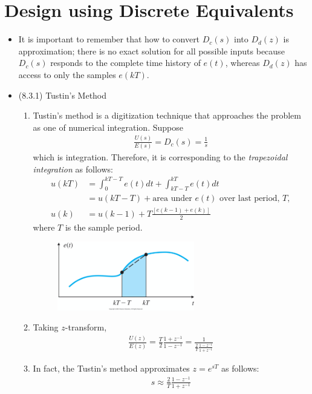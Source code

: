 \documentclass[landscape,14pt]{oblivoir}
\begin{document}
\section{Design using Discrete Equivalents}
\begin{itemize}
	\item It is important to remember that how to convert $D_c(s)$ into $D_d(z)$ is approximation; there is no exact solution for all possible inputs because $D_c(s)$ responds to the complete time history of $e(t)$, whereas $D_d(z)$ has access to only the samples $e(kT)$. 
	\item (8.3.1) Tustin's Method
	\begin{enumerate}
		\item Tustin's method is a digitization technique that approaches the problem as one of numerical integration. Suppose 
		\begin{align*}
			\frac{U(s)}{E(s)}  = D_c(s) = \frac{1}{s} 
		\end{align*}
		which is integration. Therefore, it is corresponding to the \emph{trapezoidal integration} as follows:
		\begin{align*}
			u(kT) &= \int_{0}^{kT-T} e(t) dt + \int_{kT -T}^{kT} e(t) dt \\
			&= u(kT-T) + \mbox{area under $e(t)$ over last period, $T$},  \\
			u(k) &= u(k-1) + T \frac{[e(k-1)+e(k)]}{2}
		\end{align*}
		where $T$ is the sample period. 
		\begin{figure}[h] 
			\includegraphics[width=6cm]{./FIG_Franklin/fig8-7.png}
		\end{figure}
		\item Taking $z$-transform, 
		\begin{align*}
			\frac{U(z)}{E(z)} = \frac{T}{2} \frac{1+z^{-1}}{1-z^{-1}} = \frac{1}{\frac{2}{T} \frac{1-z^{-1}}{1+z^{-1}} }
		\end{align*}
		\item In fact, the Tustin's method approximates $z = e^{sT}$ as follows:
		\begin{align*}
			s \approx  \frac{2}{T} \frac{1-z^{-1}}{1+z^{-1}}
		\end{align*}

\end{enumerate}
\end{itemize}
\end{document}
